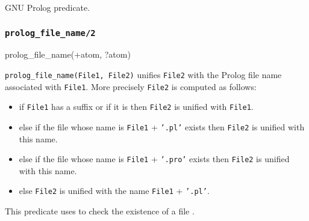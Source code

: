 \Portability

GNU Prolog predicate.

\subsubsection{\texttt{prolog\_file\_name/2}}
\label{prolog-file-name/2}

\begin{TemplatesOneCol}
prolog\_file\_name(+atom, ?atom)

\end{TemplatesOneCol}

\Description

\texttt{prolog\_file\_name(File1, File2)} unifies \texttt{File2} with the
Prolog file name associated with \texttt{File1}. More precisely \texttt{File2}
is computed as follows:

\begin{itemize}

\item if \texttt{File1} has a suffix or if it is  then
\texttt{File2} is unified with \texttt{File1}.

\item else if the file whose name is \texttt{File1} + \texttt{'.pl'} exists
then \texttt{File2} is unified with this name.

\item else if the file whose name is \texttt{File1} + \texttt{'.pro'} exists
then \texttt{File2} is unified with this name.

\item else \texttt{File2} is unified with the name \texttt{File1} +
\texttt{'.pl'}.

\end{itemize}

This predicate uses  to check the existence
of a file .

\begin{PlErrors}





\end{PlErrors}

